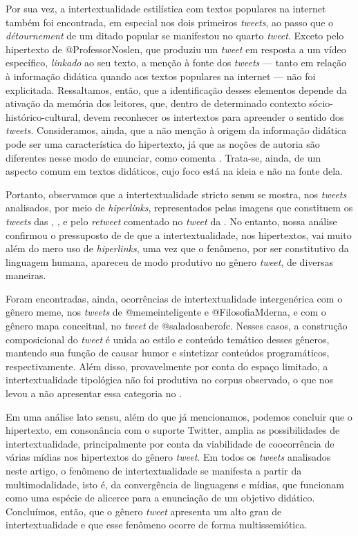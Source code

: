 \documentclass{textolivre}
\begin{document}
Por sua vez, a intertextualidade estilística com textos populares na internet também foi encontrada, em especial nos dois primeiros \textit{tweets}, ao passo que o \textit{détournement} de um ditado popular se manifestou no quarto \textit{tweet}. Exceto pelo hipertexto de @ProfessorNoslen, que produziu um \textit{tweet} em resposta a um vídeo específico, \textit{linkado} ao seu texto, a menção à fonte dos \textit{tweets} — tanto em relação à informação didática quando aos textos populares na internet — não foi explicitada. Ressaltamos, então, que a identificação desses elementos depende da ativação da memória dos leitores, que, dentro de determinado contexto sócio-histórico-cultural, devem reconhecer os intertextos para apreender o sentido dos \textit{tweets}. Consideramos, ainda, que a não menção à origem da informação didática pode ser uma característica do hipertexto, já que as noções de autoria são diferentes nesse modo de enunciar, como comenta \textcite{xavier_desafio_2015}. Trata-se, ainda, de um aspecto comum em textos didáticos, cujo foco está na ideia e não na fonte dela.

Portanto, observamos que a intertextualidade stricto sensu se mostra, nos \textit{tweets} analisados, por meio de \textit{hiperlinks}, representados pelas imagens que constituem os \textit{tweets} das , ,  e pelo \textit{retweet} comentado no \textit{tweet} da . No entanto, nossa análise confirmou o pressuposto de \textcite{araujo_consideracoes_2009} de que a intertextualidade, nos hipertextos, vai muito além do mero uso de \textit{hiperlinks}, uma vez que o fenômeno, por ser constitutivo da linguagem humana, apareceu de modo produtivo no gênero \textit{tweet}, de diversas maneiras.

Foram encontradas, ainda, ocorrências de intertextualidade intergenérica com o gênero meme, nos \textit{tweets} de @memeinteligente e @FilosofiaMderna, e com o gênero mapa conceitual, no \textit{tweet} de @saladosaberofc. Nesses casos, a construção composicional do \textit{tweet} é unida ao estilo e conteúdo temático desses gêneros, mantendo sua função de causar humor e sintetizar conteúdos programáticos, respectivamente. Além disso, provavelmente por conta do espaço limitado, a intertextualidade tipológica não foi produtiva no corpus observado, o que nos levou a não apresentar essa categoria no .

Em uma análise lato sensu, além do que já mencionamos, podemos concluir que o hipertexto, em consonância com o suporte Twitter, amplia as possibilidades de intertextualidade, principalmente por conta da viabilidade de coocorrência de várias mídias nos hipertextos do gênero \textit{tweet}. Em todos os \textit{tweets} analisados neste artigo, o fenômeno de intertextualidade se manifesta a partir da multimodalidade, isto é, da convergência de linguagens e mídias, que funcionam como uma espécie de alicerce para a enunciação de um objetivo didático. Concluímos, então, que o gênero \textit{tweet} apresenta um alto grau de intertextualidade e que esse fenômeno ocorre de forma multissemiótica.
\end{document}
